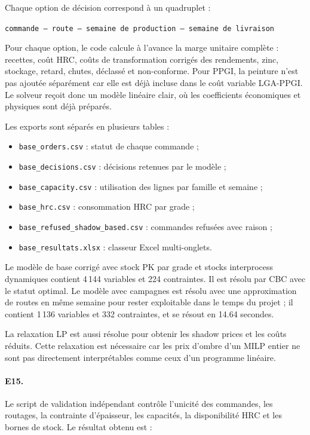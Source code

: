 \documentclass[12pt,a4paper]{article}
\newcommand{\question}[1]{\paragraph{\textcolor{blue!50!black}{#1.}}}
\begin{document}
Chaque option de décision correspond à un quadruplet :

\begin{center}
\texttt{commande -- route -- semaine de production -- semaine de livraison}
\end{center}

Pour chaque option, le code calcule à l'avance la marge unitaire complète : recettes, coût HRC, coûts de transformation corrigés des rendements, zinc, stockage, retard, chutes, déclassé et non-conforme. Pour PPGI, la peinture n'est pas ajoutée séparément car elle est déjà incluse dans le coût variable LGA-PPGI. Le solveur reçoit donc un modèle linéaire clair, où les coefficients économiques et physiques sont déjà préparés.

Les exports sont séparés en plusieurs tables :

\begin{itemize}
    \item \texttt{base\_orders.csv} : statut de chaque commande ;
    \item \texttt{base\_decisions.csv} : décisions retenues par le modèle ;
    \item \texttt{base\_capacity.csv} : utilisation des lignes par famille et semaine ;
    \item \texttt{base\_hrc.csv} : consommation HRC par grade ;
    \item \texttt{base\_refused\_shadow\_based.csv} : commandes refusées avec raison ;
    \item \texttt{base\_resultats.xlsx} : classeur Excel multi-onglets.
\end{itemize}

Le modèle de base corrigé avec stock PK par grade et stocks interprocess dynamiques contient 4\,144 variables et 224 contraintes. Il est résolu par CBC avec le statut optimal. Le modèle avec campagnes est résolu avec une approximation de routes en même semaine pour rester exploitable dans le temps du projet ; il contient 1\,136 variables et 332 contraintes, et se résout en 14.64 secondes.

La relaxation LP est aussi résolue pour obtenir les shadow prices et les coûts réduits. Cette relaxation est nécessaire car les prix d'ombre d'un MILP entier ne sont pas directement interprétables comme ceux d'un programme linéaire.

\question{E15}
Le script de validation indépendant contrôle l'unicité des commandes, les routages, la contrainte d'épaisseur, les capacités, la disponibilité HRC et les bornes de stock. Le résultat obtenu est :
\end{document}
